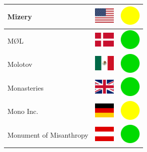 \documentclass[12pt, a4paper, twoside]{report}
\begin{document}
\begin{center}
\begin{longtable}{|p{5cm}|p{2cm}|p{2cm}|}
 Mizery                                                     & \includegraphics[width=1cm]{../4x3/us} &   \includegraphics[width=1cm]{../likes/m} \\ \hline
 MØL                                                        & \includegraphics[width=1cm]{../4x3/dk} &   \includegraphics[width=1cm]{../likes/y} \\ \hline
 Molotov                                                    & \includegraphics[width=1cm]{../4x3/mx} &   \includegraphics[width=1cm]{../likes/y} \\ \hline
 Monasteries                                                & \includegraphics[width=1cm]{../4x3/gb} &   \includegraphics[width=1cm]{../likes/y} \\ \hline
 Mono Inc.                                                  & \includegraphics[width=1cm]{../4x3/de} &   \includegraphics[width=1cm]{../likes/m} \\ \hline
 Monument of Misanthropy                                    & \includegraphics[width=1cm]{../4x3/at} &   \includegraphics[width=1cm]{../likes/y} \\ \hline

\end{longtable}
\end{center}
\end{document}
